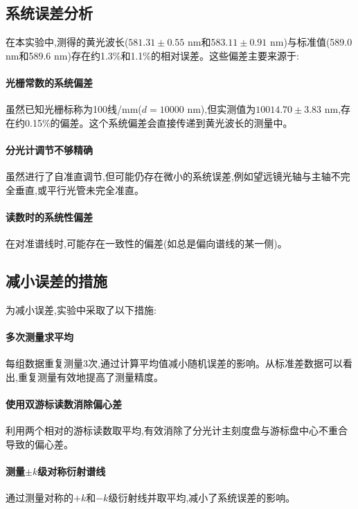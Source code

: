 ﻿\documentclass[12pt,a4paper]{article}
\begin{document}
\subsection{系统误差分析}

在本实验中,测得的黄光波长($581.31 \pm 0.55$ nm和$583.11 \pm 0.91$ nm)与标准值(589.0 nm和589.6 nm)存在约1.3\%和1.1\%的相对误差。这些偏差主要来源于:

\paragraph{光栅常数的系统偏差}虽然已知光栅标称为100线/mm($d=10000$ nm),但实测值为$10014.70 \pm 3.83$ nm,存在约0.15\%的偏差。这个系统偏差会直接传递到黄光波长的测量中。

\paragraph{分光计调节不够精确}虽然进行了自准直调节,但可能仍存在微小的系统误差,例如望远镜光轴与主轴不完全垂直,或平行光管未完全准直。

\paragraph{读数时的系统性偏差}在对准谱线时,可能存在一致性的偏差(如总是偏向谱线的某一侧)。

\subsection{减小误差的措施}

为减小误差,实验中采取了以下措施:

\paragraph{多次测量求平均}每组数据重复测量3次,通过计算平均值减小随机误差的影响。从标准差数据可以看出,重复测量有效地提高了测量精度。

\paragraph{使用双游标读数消除偏心差}利用两个相对的游标读数取平均,有效消除了分光计主刻度盘与游标盘中心不重合导致的偏心差。

\paragraph{测量$\pm k$级对称衍射谱线}通过测量对称的$+k$和$-k$级衍射线并取平均,减小了系统误差的影响。
\end{document}
